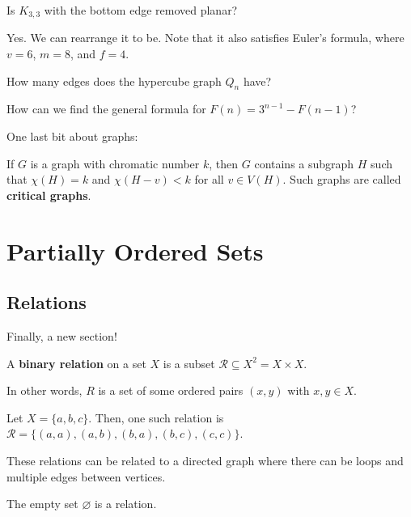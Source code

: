 \documentclass[a4paper]{article}
\begin{document}
\begin{eg}
	Is \( K_{3,3} \) with the bottom edge removed planar?
\end{eg}

Yes. We can rearrange it to be. Note that it also satisfies Euler's formula, where \( v = 6 \), \( m = 8 \), and \( f = 4 \).

How many edges does the hypercube graph \( Q_n \) have?

How can we find the general formula for \( F(n) = 3^{n-1} - F(n-1) \)?


One last bit about graphs:

\begin{note}
	If \( G \) is a graph with chromatic number \( k \), then \( G \) contains a subgraph \( H \) such that \( \chi (H)=k \) and \( \chi (H-v) < k \) for all \( v \in  V(H) \). Such graphs are called \textbf{critical graphs}.
\end{note}

\section{Partially Ordered Sets}

\subsection{Relations}

Finally, a new section!

\begin{definition}
	A \textbf{binary relation} on a set \( X \) is a subset \( \mathcal{R} \subseteq X^2 = X \times X \).
\end{definition}

In other words, \( R \) is a set of some ordered pairs \( (x,y) \) with \( x,y \in  X \).

\begin{eg}
	Let \( X=\{a,b,c\}   \). Then, one such relation is \( \mathcal{R}=\{(a,a),(a,b),(b,a),(b,c),(c,c)\}   \).
\end{eg}

\begin{note}
	These relations can be related to a directed graph where there can be loops and multiple edges between vertices.
\end{note}

\begin{eg}
	The empty set \( \varnothing \) is a relation.
\end{eg}
\end{document}
